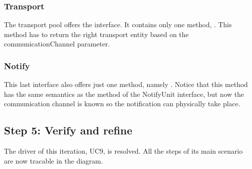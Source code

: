 \subsubsection{Transport}

\npar The transport pool offers the  interface. It contains
only one method, . This method has to
return the right transport entity based on the communicationChannel parameter.

\subsubsection{Notify}

\npar This last interface also offers just one method, namely
. Notice that this method has the same semantics as the
method of the {NotifyUnit} interface, but now the communication channel is known
so the notification can physically take place.

\subsection{Step 5: Verify and refine}
\label{add:it7/verification}

\npar The driver of this iteration, UC9, is resolved. All the steps of its main
scenario are now tracable in the diagram.
